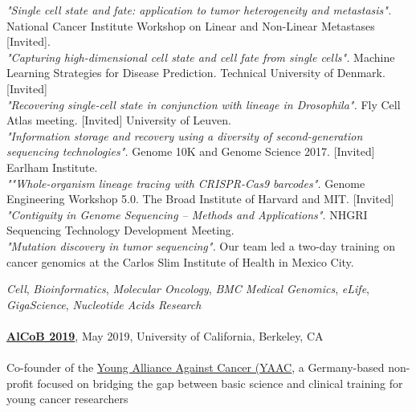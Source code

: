 \documentclass[9pt]{article}
\begin{document}
\noindent \textit{"Single cell state and fate: application to tumor heterogeneity and metastasis".} National Cancer Institute Workshop on Linear and Non-Linear Metastases [Invited]. 
\\
\newline \noindent \textit{"Capturing high-dimensional cell state and cell fate from single cells".} Machine Learning Strategies for Disease Prediction. Technical University of Denmark. [Invited]
\\
\newline \noindent \textit{"Recovering single-cell state in conjunction with lineage in Drosophila".} Fly Cell Atlas meeting. [Invited] University of Leuven. 
\\
\newline \noindent \textit{"Information storage and recovery using a diversity of second-generation sequencing technologies".} Genome 10K and Genome Science 2017. [Invited] Earlham Institute. 
\\
\newline \noindent \textit{""Whole-organism lineage tracing with CRISPR-Cas9 barcodes".}
Genome Engineering Workshop 5.0. The Broad Institute of Harvard and MIT. [Invited]
\\
\newline \noindent \textit{"Contiguity in Genome Sequencing -- Methods and Applications".}
NHGRI Sequencing Technology Development Meeting. 
\\
\newline \noindent \textit{"Mutation discovery in tumor sequencing".} Our team led a two-day training on cancer genomics at the Carlos Slim Institute of Health in Mexico City.


\bigskip


\medskip
{}

 \textit{Cell}, \textit{Bioinformatics}, \textit{Molecular Oncology}, \textit{BMC Medical Genomics}, \textit{eLife}, \textit{GigaScience}, \textit{Nucleotide Acids Research}
\\
\newline {} 
\\
\newline \noindent \href{http://alcob2019.irdta.eu/}{\bf AlCoB 2019}, May 2019, University of California, Berkeley, CA
\\
\newline {} 
\\
\newline\noindent Co-founder of the \href{http://youngalliance.github.io/}{Young Alliance Against Cancer (YAAC}, a Germany-based non-profit focused on bridging the gap between basic science and clinical training for young cancer researchers
\end{document}
